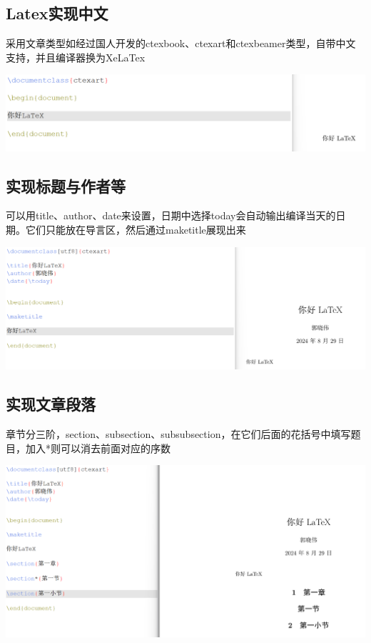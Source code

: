 \documentclass[UTF8,a4paper]{ctexart}
\begin{document}
\begin{sloppypar}
	\subsection{Latex实现中文}
	采用文章类型如经过国人开发的ctexbook、ctexart和ctexbeamer类型，自带中文支持，并且编译器换为XeLaTex
	
	\includegraphics[width = 16cm]{13}
	
	\subsection{实现标题与作者等}
	可以用title、author、date来设置，日期中选择today会自动输出编译当天的日期。它们只能放在导言区，然后通过maketitle展现出来
	
	\includegraphics[width = 16cm]{14}
	
	\subsection{实现文章段落}
	章节分三阶，section、subsection、subsubsection，在它们后面的花括号中填写题目，加入*则可以消去前面对应的序数
	
	\includegraphics[width = 16cm]{15}
	

\end{sloppypar}
\end{document}
